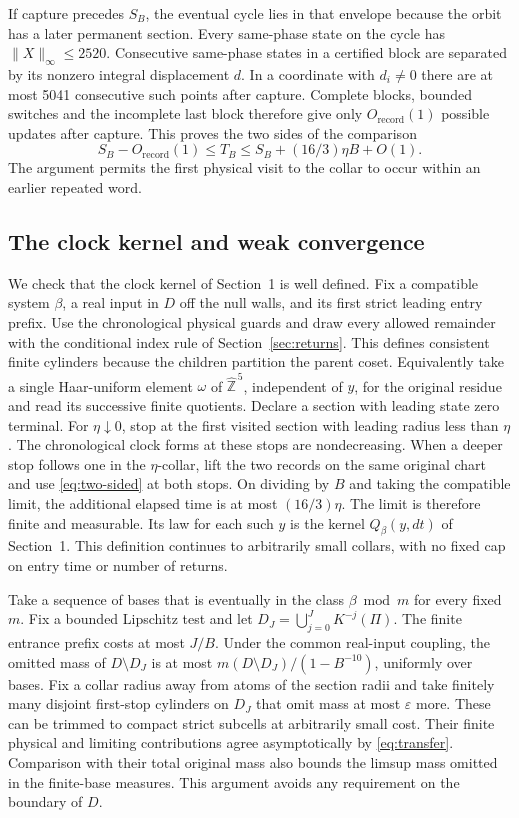 \documentclass[11pt,reqno]{amsart}
\theoremstyle{definition}
\newcommand{\Z}{\mathbb Z}
\newcommand{\Zhat}{\widehat{\Z}}
\begin{document}
If capture precedes \(S_B\), the eventual cycle lies in that
envelope because the orbit has a later permanent section. Every
same-phase state on the cycle has \(\|X\|_\infty\le2520\). Consecutive
same-phase states in a certified block are separated by its nonzero
integral displacement \(d\). In a coordinate with \(d_i\ne0\) there
are at most 5041 consecutive such points after capture. Complete
blocks, bounded switches and the incomplete last block therefore
give only \(O_{\text{record}}(1)\) possible updates after capture.
This proves the two sides of the comparison
\begin{equation}\label{eq:two-sided}
 S_B-O_{\text{record}}(1)\le T_B\le S_B+(16/3)\eta B+O(1).
\end{equation}
The argument permits the first physical visit to the collar to
occur within an earlier repeated word.

\subsection{The clock kernel and weak convergence}\label{sec:kernel}
We check that the clock kernel of Section~1 is well defined. Fix a
compatible system \(\beta\), a real input in \(D\) off the null walls,
and its first strict leading entry prefix. Use the chronological
physical guards and draw every allowed remainder with the conditional
index rule of Section~\ref{sec:returns}. This defines consistent finite
cylinders because the children partition the parent coset. Equivalently
take a single Haar-uniform element \(\omega\) of \(\Zhat^{\,5}\),
independent of \(y\), for the original residue and read its successive
finite quotients. Declare a section with leading state zero terminal.
For \(\eta\downarrow0\), stop at the first visited section with leading
radius less than \(\eta\). The chronological clock forms at these stops
are nondecreasing. When a deeper stop follows one in the
\(\eta\)-collar, lift the two records on the same original chart and use
\eqref{eq:two-sided} at both stops. On dividing by \(B\) and taking the
compatible limit, the additional elapsed time is at most
\((16/3)\eta\). The limit is therefore finite and measurable. Its law
for each such \(y\) is the kernel \(Q_\beta(y,dt)\) of Section~1. This
definition continues to arbitrarily small collars, with no fixed cap on
entry time or number of returns.

Take a sequence of bases that is eventually in the class
\(\beta\bmod m\) for every fixed \(m\). Fix a bounded Lipschitz test and
let \(D_J=\bigcup_{j=0}^J K^{-j}(\Pi)\).
The finite entrance prefix costs at most \(J/B\). Under the common
real-input coupling, the omitted mass of \(D\setminus D_J\) is at most
\(m(D\setminus D_J)/(1-B^{-10})\), uniformly over bases. Fix a collar
radius away from atoms of the section radii and take finitely
many disjoint first-stop cylinders on
\(D_J\) that omit mass at most \(\varepsilon\) more. These can be trimmed
to compact strict subcells at arbitrarily small cost. Their finite
physical and limiting contributions agree asymptotically by
\eqref{eq:transfer}. Comparison with their total original mass also
bounds the limsup mass omitted in the finite-base measures. This
argument avoids any requirement on the boundary of \(D\).
\end{document}
